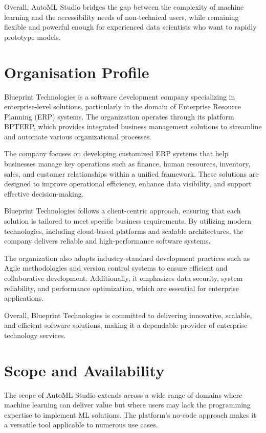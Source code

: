 \documentclass[12pt,a4paper]{report}
\begin{document}
Overall, AutoML Studio bridges the gap between the complexity of machine learning and the accessibility needs of non-technical users, while remaining flexible and powerful enough for experienced data scientists who want to rapidly prototype models.

\section{Organisation Profile}
Blueprint Technologies is a software development company specializing in enterprise-level solutions, particularly in the domain of Enterprise Resource Planning (ERP) systems. The organization operates through its platform BPTERP, which provides integrated business management solutions to streamline and automate various organizational processes.

The company focuses on developing customized ERP systems that help businesses manage key operations such as finance, human resources, inventory, sales, and customer relationships within a unified framework. These solutions are designed to improve operational efficiency, enhance data visibility, and support effective decision-making.

Blueprint Technologies follows a client-centric approach, ensuring that each solution is tailored to meet specific business requirements. By utilizing modern technologies, including cloud-based platforms and scalable architectures, the company delivers reliable and high-performance software systems.

The organization also adopts industry-standard development practices such as Agile methodologies and version control systems to ensure efficient and collaborative development. Additionally, it emphasizes data security, system reliability, and performance optimization, which are essential for enterprise applications.

Overall, Blueprint Technologies is committed to delivering innovative, scalable, and efficient software solutions, making it a dependable provider of enterprise technology services.

\section{Scope and Availability}
The scope of AutoML Studio extends across a wide range of domains where machine learning can deliver value but where users may lack the programming expertise to implement ML solutions. The platform's no-code approach makes it a versatile tool applicable to numerous use cases.
\end{document}

